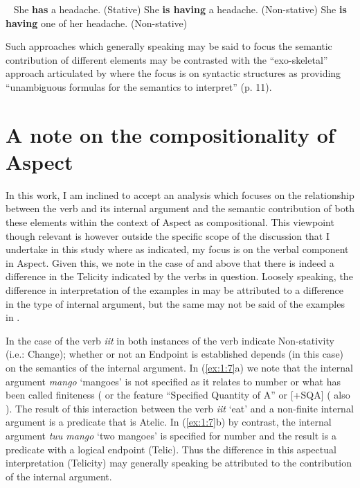 \ea\label{ex:1:2b}~\citep[adapted from][707]{Lyons1977}
  \ea She \textbf{has} a headache. (Stative)
  \ex She \textbf{is having} a headache. (Non-stative)
  \ex She \textbf{is having} one of her headache. (Non-stative)
\z
\z

Such approaches which generally speaking may be said
to focus the semantic contribution of different elements may be contrasted with
the ``exo-skeletal'' approach articulated by \citet{Borer2005} where the focus
is on syntactic structures as providing  ``unambiguous formulas for the semantics
to interpret'' (p. 11).

\section{A note on the compositionality of Aspect}\label{sec:1.4}

In this work, I am inclined to accept an analysis which focuses on the
relationship between the verb and its internal argument and the semantic
contribution of both these elements within the context of Aspect as
compositional.  This viewpoint though relevant is however outside the specific
scope of the discussion that I undertake in this study where as indicated, my
focus is on the verbal component in Aspect.  Given this, we note in the case of
 and  above that there is indeed a difference in the
Telicity indicated by the verbs in question.  Loosely speaking, the difference
in interpretation of the examples in  may be attributed to a
difference in the type of internal argument, but the same may not be said of the
examples in .


In the case of the verb \textit{iit} in  both instances of the verb
indicate Non-stativity (i.e.: Change); whether or not an Endpoint is established
depends (in this case) on the semantics of the internal argument.  In
(\ref{ex:1:7}a) we note that the internal argument \textit{mango} `mangoes' is
not specified as it relates to number or what has been called finiteness
(\citet{Verkuyl1993} or the feature ``Specified Quantity of A'' or [+SQA]
(\citealt{Verkuyl1993,Verkuyl1999} also \citealt{Krifka1998}).  The result of this
interaction between the verb \textit{iit} `eat' and a non-finite internal
argument is a predicate that is Atelic.  In (\ref{ex:1:7}b) by contrast, the
internal argument \textit{tuu mango} `two mangoes' is specified for number and
the result is a predicate with a logical endpoint (Telic).  Thus the difference
in this aspectual interpretation (Telicity) may generally speaking be attributed
to the contribution of the internal argument.

